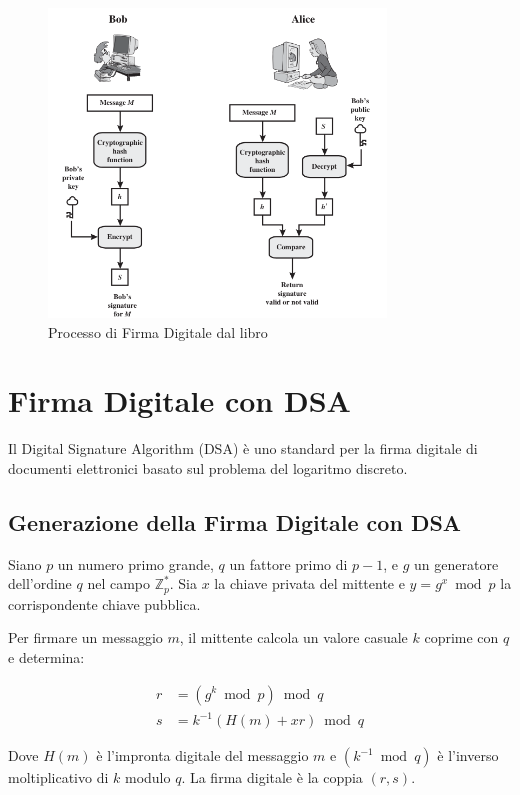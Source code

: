 \documentclass[a4paper,12pt]{report}
\begin{document}
\begin{figure}[ht]
    \centering
    \includegraphics[width=0.8\textwidth]{img/digital_signature_process.png}
    \caption{Processo di Firma Digitale dal libro \cite{stallings2011cryptography}}
    \label{fig:digital_signature_process}
\end{figure}

\section{Firma Digitale con DSA}
Il Digital Signature Algorithm (DSA) è uno standard per la firma digitale di documenti elettronici basato sul problema del logaritmo discreto.

\subsection*{Generazione della Firma Digitale con DSA}
Siano $p$ un numero primo grande, $q$ un fattore primo di $p - 1$, e $g$ un generatore dell'ordine $q$ nel campo $\mathbb{Z}_p^*$. Sia $x$ la chiave privata del mittente e $y = g^x \bmod p$ la corrispondente chiave pubblica.

Per firmare un messaggio $m$, il mittente calcola un valore casuale $k$ coprime con $q$ e determina:

\begin{align*}
r &= (g^k \bmod p) \bmod q \\
s &= k^{-1}(H(m) + xr) \bmod q
\end{align*}

Dove $H(m)$ è l'impronta digitale del messaggio $m$ e $(k^{-1} \bmod q)$ è l'inverso moltiplicativo di $k$ modulo $q$. La firma digitale è la coppia $(r, s)$.
\end{document}
